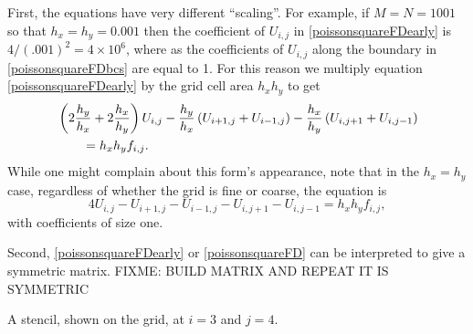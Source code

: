 First, the equations have very different ``scaling''.  For example, if $M=N=1001$ so that $h_x=h_y=0.001$ then the coefficient of $U_{i,j}$ in \eqref{poissonsquareFDearly} is $4/(.001)^2 = 4 \times 10^6$, where as the coefficients of $U_{i,j}$ along the boundary in \eqref{poissonsquareFDbcs} are equal to 1.  For this reason we multiply equation \eqref{poissonsquareFDearly} by the grid cell area $h_x h_y$ to get
\begin{align}
&\left(2 \frac{h_y}{h_x} + 2 \frac{h_x}{h_y}\right) U_{i,j} - \frac{h_y}{h_x}\left(U_{i+1,j} + U_{i-1,j}\right)  - \frac{h_x}{h_y}\left(U_{i,j+1} + U_{i,j-1}\right) \label{poissonsquareFD} \\
&\qquad = h_x h_y f_{i,j}. \notag
\end{align}
While one might complain about this form's appearance, note that in the $h_x=h_y$ case, regardless of whether the grid is fine or coarse, the equation is
    $$4 U_{i,j} - U_{i+1,j} - U_{i-1,j} - U_{i,j+1} - U_{i,j-1}  = h_x h_y f_{i,j},$$
with coefficients of size one.

Second, \eqref{poissonsquareFDearly} or \eqref{poissonsquareFD} can be interpreted to give a symmetric matrix.  FIXME: BUILD MATRIX AND REPEAT IT IS SYMMETRIC


\begin{marginfigure}
\caption{A stencil, shown on the grid, at $i=3$ and $j=4$.}
\label{fig:unitsquaregridstencil}
\end{marginfigure}



